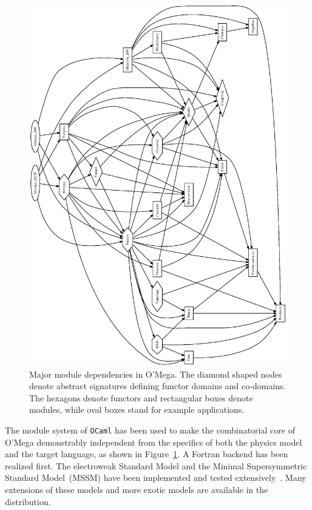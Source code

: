 \documentclass[12pt,a4paper]{article}
\def\OCaml/{\texttt{OCaml}}
\begin{document}
\begin{figure}
  \includegraphics[height=.9\textheight]{modules}
  \caption{\label{fig:modules}%
    Major module dependencies in O'Mega.  The diamond shaped nodes denote
    abstract signatures defining functor domains and co-domains.
    The hexagons denote functors and
    rectangular boxes denote modules, while oval
    boxes stand for example applications.}
\end{figure}
The module system of \OCaml/ has been used to make the combinatorial
core of O'Mega demonstrably independent from the specifics of both the
physics model and the target language, as shown in
Figure~\ref{fig:modules}.  A Fortran backend has been realized
first.  The electroweak Standard Model and the Minimal Supersymmetric
Standard Model~(MSSM) have been implemented and tested
extensively~\cite{Hagiwara:2005wg}.  Many extensions of these models
and more exotic models are available in the distribution.
\end{document}
